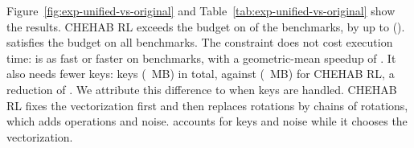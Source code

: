 Figure~\ref{fig:exp-unified-vs-original} and Table~\ref{tab:exp-unified-vs-original} show the results. CHEHAB RL exceeds the budget on  of the  benchmarks, by up to  (). \ToolName{} satisfies the budget on all benchmarks. The constraint does not cost execution time: \ToolName{} is as fast or faster on  benchmarks, with a geometric-mean speedup of \inred{$1.02\times$}. It also needs fewer keys:  keys (~MB) in total, against  (~MB) for CHEHAB RL, a reduction of . We attribute this difference to when keys are handled. CHEHAB RL fixes the vectorization first and then replaces rotations by chains of rotations, which adds operations and noise. \ToolName{} accounts for keys and noise while it chooses the vectorization.
